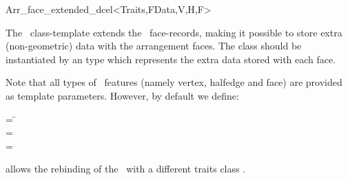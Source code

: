 
\ccRefPageBegin

\begin{ccRefClass}{Arr_face_extended_dcel<Traits,FData,V,H,F>}

\ccDefinition

The \ccRefName\ class-template extends the \dcel\ face-records, making it
possible to store extra (non-geometric) data with the arrangement faces.
The class should be instantiated by an  type which represents the
extra data stored with each face. 

Note that all types of \dcel\ features (namely vertex, halfedge and face)
are provided as template parameters. However, by default we define:

\begin{tabbing}
 = \=\\
 = \>\\
 = \>
\end{tabbing}


\ccIsModel

\ccInheritsFrom

\ccTypes

  {allows the rebinding of the \dcel\ with a different traits class .}

\ccSeeAlso


\end{ccRefClass}

\ccRefPageEnd
